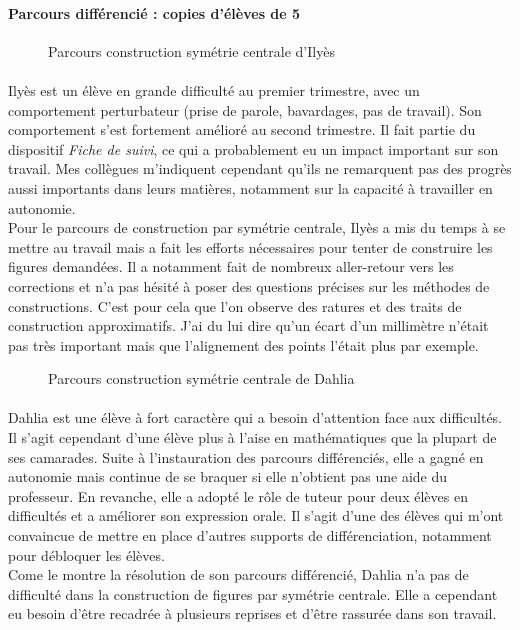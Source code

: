 \paragraph{Parcours différencié : copies d'élèves de 5 \\}
\begin{figure}[!h]
	\centering
	\caption{Parcours construction symétrie centrale d'Ilyès}
\end{figure}
\paragraph{}Ilyès est un élève en grande difficulté au premier trimestre, avec un comportement perturbateur (prise de parole, bavardages, pas de travail). Son comportement s'est fortement amélioré au second trimestre. Il fait partie du dispositif \textit{Fiche de suivi}, ce qui a probablement eu un impact important sur son travail. Mes collègues m'indiquent cependant qu'ils ne remarquent pas des progrès aussi importants dans leurs matières, notamment sur la capacité à travailler en autonomie.\\
Pour le parcours de construction par symétrie centrale, Ilyès a mis du temps à se mettre au travail mais a fait les efforts nécessaires pour tenter de construire les figures demandées. Il a notamment fait de nombreux aller-retour vers les corrections et n'a pas hésité à poser des questions précises sur les méthodes de constructions. C'est pour cela que l'on observe des ratures et des traits de construction approximatifs. J'ai du lui dire qu'un écart d'un millimètre n'était pas très important mais que l'alignement des points l'était plus par exemple. 
\begin{figure}[!h]
	\centering
	\caption{Parcours construction symétrie centrale de Dahlia}
\end{figure}
\paragraph{}Dahlia est une élève à fort caractère qui a besoin d'attention face aux difficultés. Il s'agit cependant d'une élève plus à l'aise en mathématiques que la plupart de ses camarades. Suite à l'instauration des parcours différenciés, elle a gagné en autonomie mais continue de se braquer si elle n'obtient pas une aide du professeur. En revanche, elle a adopté le rôle de tuteur pour deux élèves en difficultés et a améliorer son expression orale. Il s'agit d'une des élèves qui m'ont convaincue de mettre en place d'autres supports de différenciation, notamment pour débloquer les élèves.\\
Come le montre la résolution de son parcours différencié, Dahlia n'a pas de difficulté dans la construction de figures par symétrie centrale. Elle a cependant eu besoin d'être recadrée à plusieurs reprises et d'être rassurée dans son travail.
